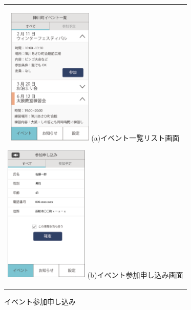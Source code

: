 \begin{figure}[htbp]
  \begin{center}
    \begin{tabular}{c}

      \begin{minipage}{0.33\hsize}
        \begin{center}
\includegraphics[width=4cm]{event_list_town.png}
          \hspace{1cm} %
          {\footnotesize (a)イベント一覧リスト画面}
        \end{center}
      \end{minipage}

      \begin{minipage}{0.33\hsize}
        \begin{center}
\includegraphics[width=4cm]{participant_form}
          \hspace{1cm}%
          {\footnotesize (b)イベント参加申し込み画面}
        \end{center}
      \end{minipage}

    \end{tabular}
    \caption{イベント参加申し込み}
    \label{tab:request_event}
  \end{center}
\end{figure}

